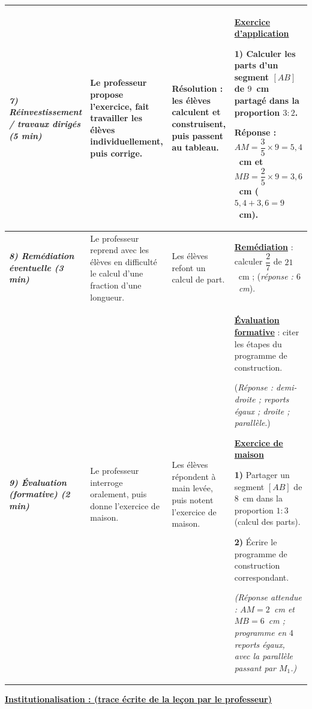 \documentclass[10pt]{article}
\newcommand{\titreR}[1]{\underline{\textcolor{rougetitre}{\bfseries #1}}}
\newcommand{\app}{\titreR{Exercice d'application}}
\newcommand{\maison}{\underline{\textcolor{rougemaison}{\bfseries Exercice de maison}}}
\newcommand{\moment}[1]{\textbf{\itshape #1}}
\begin{document}
\begin{longtable}{|p{2.35cm}|p{5.35cm}|p{4.55cm}|p{13.85cm}|}
\moment{7) Réinvestissement / travaux dirigés (5 min)} &
Le professeur propose l'exercice, fait travailler les élèves individuellement, puis corrige. &
\textbf{Résolution} : les élèves calculent et construisent, puis passent au tableau. &
\app \par
\textbf{1)} Calculer les parts d'un segment $[AB]$ de $9$~cm partagé dans la
proportion $3:2$. \par
\textbf{Réponse :} $AM=\dfrac{3}{5}\times9=5{,}4$~cm et
$MB=\dfrac{2}{5}\times9=3{,}6$~cm ($5{,}4+3{,}6=9$~cm). \\ \hline

\moment{8) Remédiation éventuelle (3 min)} &
Le professeur reprend avec les élèves en difficulté  le calcul d'une fraction d'une longueur. &
Les élèves refont  un calcul de part. &
\titreR{Remédiation} : calculer $\dfrac{2}{7}$ de $21$~cm ;
(\textit{réponse : $6$~cm}). \\ \hline

\moment{9) Évaluation (formative) (2 min)} &
Le professeur interroge oralement, puis donne l'exercice de maison. &
Les élèves répondent à main levée, puis notent l'exercice de maison. &
\titreR{Évaluation formative} : citer les étapes du programme de construction. \par
(\textit{Réponse : demi-droite ; reports égaux ; droite ; parallèle}.) \par
\maison \par
\textbf{1)} Partager un segment $[AB]$ de $8$~cm dans la proportion $1:3$
(calcul des parts). \par
\textbf{2)} Écrire le programme de construction correspondant. \par
\textit{(Réponse attendue : $AM=2$~cm et $MB=6$~cm ; programme en $4$ reports égaux, avec la parallèle passant par $M_1$.)} \\ \hline
\end{longtable}

\begin{center}
\underline{\textcolor{rougetitre}{\large\bfseries Institutionalisation \; : \; (trace écrite de la leçon par le professeur)}}
\end{center}
\end{document}
